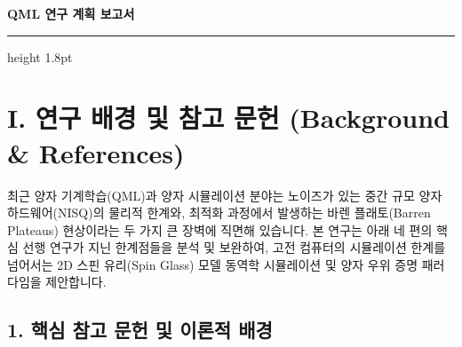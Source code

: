 \documentclass[11pt,a4paper]{article}
\begin{document}
\begin{center}
    {\LARGE \textbf{\color{primary} QML 연구 계획 보고서}} \\[0.35em]
    \vspace{0.2em}
    {\color{primary}\hrule height 1.8pt}
    \vspace{0.5em}
\end{center}

\section*{I. 연구 배경 및 참고 문헌 (Background \& References)}

최근 양자 기계학습(QML)과 양자 시뮬레이션 분야는 노이즈가 있는 중간 규모 양자 하드웨어(NISQ)의 물리적 한계와, 최적화 과정에서 발생하는 바렌 플래토(Barren Plateaus) 현상이라는 두 가지 큰 장벽에 직면해 있습니다. 본 연구는 아래 네 편의 핵심 선행 연구가 지닌 한계점들을 분석 및 보완하여, 고전 컴퓨터의 시뮬레이션 한계를 넘어서는 2D 스핀 유리(Spin Glass) 모델 동역학 시뮬레이션 및 양자 우위 증명 패러다임을 제안합니다.

\subsection*{1. 핵심 참고 문헌 및 이론적 배경}
\end{document}
